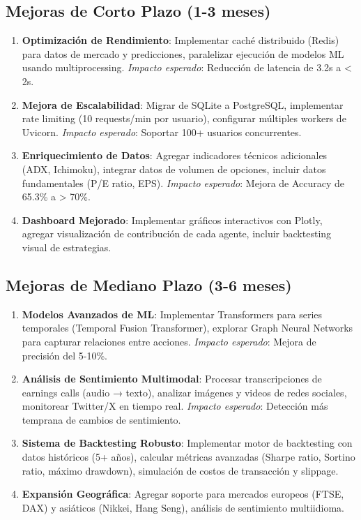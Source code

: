 \subsection{Mejoras de Corto Plazo (1-3 meses)}

\begin{enumerate}
    \item \textbf{Optimización de Rendimiento}: Implementar caché distribuido (Redis) para datos de mercado y predicciones, paralelizar ejecución de modelos ML usando multiprocessing. \textit{Impacto esperado}: Reducción de latencia de 3.2s a < 2s.

    \item \textbf{Mejora de Escalabilidad}: Migrar de SQLite a PostgreSQL, implementar rate limiting (10 requests/min por usuario), configurar múltiples workers de Uvicorn. \textit{Impacto esperado}: Soportar 100+ usuarios concurrentes.

    \item \textbf{Enriquecimiento de Datos}: Agregar indicadores técnicos adicionales (ADX, Ichimoku), integrar datos de volumen de opciones, incluir datos fundamentales (P/E ratio, EPS). \textit{Impacto esperado}: Mejora de Accuracy de 65.3\% a > 70\%.

    \item \textbf{Dashboard Mejorado}: Implementar gráficos interactivos con Plotly, agregar visualización de contribución de cada agente, incluir backtesting visual de estrategias.
\end{enumerate}

\subsection{Mejoras de Mediano Plazo (3-6 meses)}

\begin{enumerate}
    \item \textbf{Modelos Avanzados de ML}: Implementar Transformers para series temporales (Temporal Fusion Transformer), explorar Graph Neural Networks para capturar relaciones entre acciones. \textit{Impacto esperado}: Mejora de precisión del 5-10\%.

    \item \textbf{Análisis de Sentimiento Multimodal}: Procesar transcripciones de earnings calls (audio → texto), analizar imágenes y videos de redes sociales, monitorear Twitter/X en tiempo real. \textit{Impacto esperado}: Detección más temprana de cambios de sentimiento.

    \item \textbf{Sistema de Backtesting Robusto}: Implementar motor de backtesting con datos históricos (5+ años), calcular métricas avanzadas (Sharpe ratio, Sortino ratio, máximo drawdown), simulación de costos de transacción y slippage.

    \item \textbf{Expansión Geográfica}: Agregar soporte para mercados europeos (FTSE, DAX) y asiáticos (Nikkei, Hang Seng), análisis de sentimiento multiidioma.
\end{enumerate}

